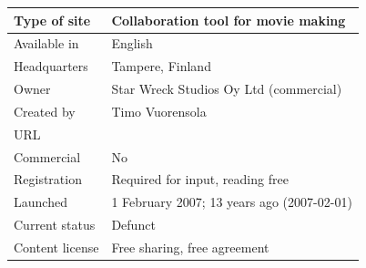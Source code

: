 \documentclass{article}
\begin{document}
\begin{tabular}{ll}
\toprule
Type of site & Collaboration tool for movie making \\
\midrule
Available in & English \\
Headquarters & Tampere, Finland \\
Owner & Star Wreck Studios Oy Ltd (commercial) \\
Created by & Timo Vuorensola \\
URL &  \\
Commercial & No \\
Registration & Required for input, reading free \\
Launched & 1 February 2007; 13 years ago (2007-02-01) \\
Current status & Defunct \\
Content license & Free sharing, free agreement \\
\bottomrule
\end{tabular}
\end{document}

